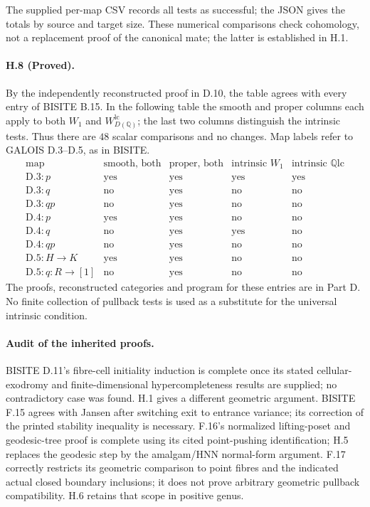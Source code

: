 The supplied per-map CSV records all tests as successful; the
JSON gives the totals by source and target size. These numerical
comparisons check cohomology, not a replacement proof of the
canonical mate; the latter is established in H.1.

\paragraph{H.8 (Proved).}
By the independently reconstructed proof in D.10, the table agrees with every
entry of BISITE B.15. In the following table the smooth and
proper columns each apply to both $W_1$ and
$W_{D(\mathbb Q)}^{\mathrm{lc}}$; the last two columns distinguish
the intrinsic tests. Thus there are $48$ scalar comparisons and
no changes. Map labels refer to GALOIS D.3--D.5, as in BISITE.
\[
\begin{array}{l|cc|cc}
\text{map}&\text{smooth, both}&\text{proper, both}
 &\text{intrinsic }W_1&\text{intrinsic }\mathbb Q\mathrm{lc}\\\hline
\mathrm{D.3}:p&\text{yes}&\text{yes}&\text{yes}&\text{yes}\\
\mathrm{D.3}:q&\text{no}&\text{yes}&\text{no}&\text{no}\\
\mathrm{D.3}:qp&\text{no}&\text{yes}&\text{no}&\text{no}\\
\mathrm{D.4}:p&\text{yes}&\text{yes}&\text{no}&\text{no}\\
\mathrm{D.4}:q&\text{no}&\text{yes}&\text{yes}&\text{no}\\
\mathrm{D.4}:qp&\text{no}&\text{yes}&\text{no}&\text{no}\\
\mathrm{D.5}:H\to K&\text{yes}&\text{yes}&\text{no}&\text{no}\\
\mathrm{D.5}:q:R\to[1]&\text{no}&\text{yes}&\text{no}&\text{no}
\end{array}
\]
The proofs, reconstructed categories and program for these
entries are in Part D. No finite collection of pullback tests
is used as a substitute for the universal intrinsic condition.

\paragraph{Audit of the inherited proofs.}
BISITE D.11's fibre-cell initiality induction is complete once
its stated cellular-exodromy and finite-dimensional
hypercompleteness results are supplied; no contradictory case
was found. H.1 gives a different geometric argument. BISITE
F.15 agrees with Jansen after switching exit to entrance
variance; its correction of the printed stability inequality
is necessary. F.16's normalized lifting-poset and geodesic-tree
proof is complete using its cited point-pushing identification;
H.5 replaces the geodesic step by the amalgam/HNN normal-form
argument. F.17 correctly restricts its geometric comparison to
point fibres and the indicated actual closed boundary
inclusions; it does not prove arbitrary geometric pullback
compatibility. H.6 retains that scope in positive genus.

